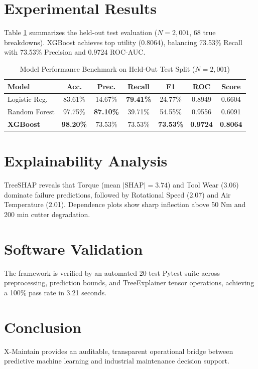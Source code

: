 \documentclass[journal,10pt,twocolumn]{IEEEtran}
\begin{document}
\section{Experimental Results}
Table \ref{tab:results} summarizes the held-out test evaluation ($N = 2,001$, 68 true breakdowns). XGBoost achieves top utility (0.8064), balancing 73.53\% Recall with 73.53\% Precision and 0.9724 ROC-AUC.

\begin{table}[b]
\centering
\caption{Model Performance Benchmark on Held-Out Test Split ($N = 2,001$)}
\label{tab:results}
\begin{tabular}{lcccccc}
\toprule
\textbf{Model} & \textbf{Acc.} & \textbf{Prec.} & \textbf{Recall} & \textbf{F1} & \textbf{ROC} & \textbf{Score} \\
\midrule
Logistic Reg. & 83.61\% & 14.67\% & \textbf{79.41\%} & 24.77\% & 0.8949 & 0.6604 \\
Random Forest & 97.75\% & \textbf{87.10\%} & 39.71\% & 54.55\% & 0.9556 & 0.6091 \\
\textbf{XGBoost} & \textbf{98.20\%} & 73.53\% & 73.53\% & \textbf{73.53\%} & \textbf{0.9724} & \textbf{0.8064} \\
\bottomrule
\end{tabular}
\end{table}

\section{Explainability Analysis}
TreeSHAP reveals that Torque ($\text{mean } |\text{SHAP}| = 3.74$) and Tool Wear (3.06) dominate failure predictions, followed by Rotational Speed (2.07) and Air Temperature (2.01). Dependence plots show sharp inflection above 50 Nm and 200 min cutter degradation.

\section{Software Validation}
The framework is verified by an automated 20-test Pytest suite across preprocessing, prediction bounds, and TreeExplainer tensor operations, achieving a 100\% pass rate in 3.21 seconds.

\section{Conclusion}
X-Maintain provides an auditable, transparent operational bridge between predictive machine learning and industrial maintenance decision support.
\end{document}
